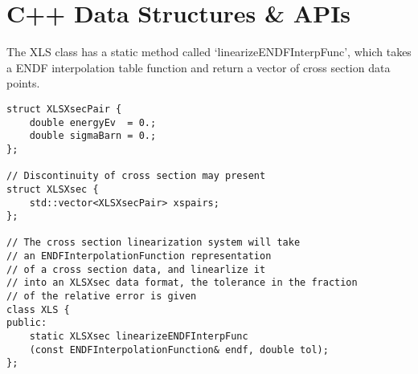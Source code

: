 \section{C++ Data Structures \& APIs}
The XLS class has a static method called `linearizeENDFInterpFunc', which takes a ENDF interpolation table function and return a vector of cross section data points.
\begin{verbatim}
struct XLSXsecPair {
    double energyEv  = 0.;
    double sigmaBarn = 0.;
};

// Discontinuity of cross section may present
struct XLSXsec {
    std::vector<XLSXsecPair> xspairs;
};

// The cross section linearization system will take
// an ENDFInterpolationFunction representation
// of a cross section data, and linearlize it
// into an XLSXsec data format, the tolerance in the fraction
// of the relative error is given
class XLS {
public:
    static XLSXsec linearizeENDFInterpFunc
    (const ENDFInterpolationFunction& endf, double tol);
};
\end{verbatim}